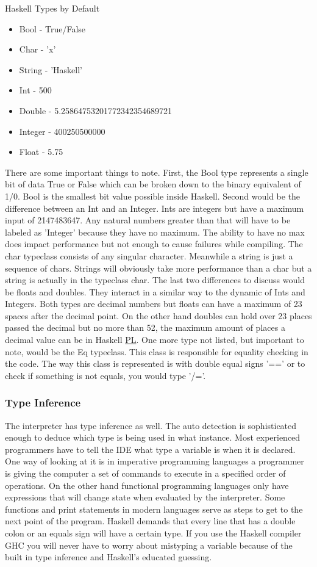 \documentclass{article}
\begin{document}
    \caption{Haskell Types by Default}
    \begin{itemize}
              \item Bool - True/False
              \item Char - 'x'
              \item String - 'Haskell'
              \item Int - 500
              \item Double - 5.25864753201772342354689721
              \item Integer - 400250500000
              \item Float - 5.75
    \end{itemize}
    
    There are some important things to note. First, the Bool type represents a single bit of data True or False which can be broken down to the binary equivalent of 1/0. Bool is the smallest bit value possible inside Haskell. Second would be the difference between an Int and an Integer. Ints are integers but have a maximum input of 2147483647. Any natural numbers greater than that will have to be labeled as 'Integer' because they have no maximum. The ability to have no max does impact performance but not enough to cause failures while compiling. The char typeclass consists of any singular character. Meanwhile a string is just a sequence of chars. Strings will obviously take more performance than a char but a string is actually in the typeclass char. The last two differences to discuss would be floats and doubles. They interact in a similar way to the dynamic of Ints and Integers. Both types are decimal numbers but floats can have a maximum of 23 spaces after the decimal point. On the other hand doubles can hold over 23 places passed the decimal but no more than 52, the maximum amount of places a decimal value can be in Haskell \href{PL}{PL}. One more type not listed, but important to note, would be the Eq typeclass. This class is responsible for equality checking in the code. The way this class is represented is with double equal signs '==' or to check if something is not equals, you would type '/='.
            
    
    \subsubsection{Type Inference}
    The interpreter has type inference as well. The auto detection is sophisticated enough to deduce which type is being used in what instance. Most experienced programmers have to tell the IDE what type a variable is when it is declared. One way of looking at it is in imperative programming languages a programmer is giving the computer a set of commands to execute in a specified order of operations. On the other hand functional programming languages only have expressions that will change state when evaluated by the interpreter. Some functions and print statements in modern languages serve as steps to get to the next point of the program. Haskell demands that every line that has a double colon or an equals sign will have a certain type. If you use the Haskell compiler GHC you will never have to worry about mistyping a variable because of the built in type inference and Haskell's educated guessing. 
    
\end{document}
